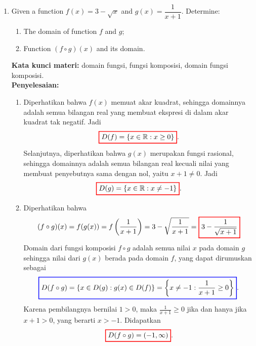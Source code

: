 \documentclass[10pt,openany,a4paper]{article}
\theoremstyle{definition}
\theoremstyle{definition}
\theoremstyle{plain}
\newenvironment{jawab}[2][tes]{%
\par\noindent\textbf{Kata kunci materi:} #1.\\
\textbf{Penyelesaian:} #2%
}{}
\begin{document}
\begin{enumerate}
    \item Given a function $f(x)=3-\sqrt{x}$ and $g(x)=\dfrac{1}{x+1}$. Determine:
    \begin{enumerate}
        \item[a)] The domain of function $f$ and $g$;
        \item[b)] Function $(f\circ g)(x)$ and its domain.
    \end{enumerate}
    \begin{jawab}[domain fungsi, fungsi komposisi, domain fungsi komposisi]{
        \begin{enumerate}
            \item Diperhatikan bahwa $f(x)$ memuat akar kuadrat, sehingga domainnya adalah semua bilangan real yang membuat ekspresi di dalam akar kuadrat tak negatif. Jadi
            \begin{align*}
                \colorlet{oldcolor}{.}
        \color{red}
        \setlength{\fboxrule}{1pt} \boxed{\color{oldcolor}D(f)=\{x \in \mathbb{R} : x \geq 0\}}\color{oldcolor}.
            \end{align*}
            Selanjutnya, diperhatikan bahwa $g(x)$ merupakan fungsi rasional, sehingga domainnya adalah semua bilangan real kecuali nilai yang membuat penyebutnya sama dengan nol, yaitu $x+1\neq 0$. Jadi
            \begin{align*}
                \colorlet{oldcolor}{.}
        \color{red}
        \setlength{\fboxrule}{1pt} \boxed{\color{oldcolor}D(g)=\{x \in \mathbb{R} : x \neq -1\}}\color{oldcolor}.
            \end{align*}
            \item Diperhatikan bahwa
            \begin{align*}
                (f\circ g)(x) = f(g(x)) = f\left(\frac{1}{x+1}\right) = 3 - \sqrt{\frac{1}{x+1}} = \colorlet{oldcolor}{.}
        \color{red}
        \setlength{\fboxrule}{1pt} \boxed{\color{oldcolor}3 - \frac{1}{\sqrt{x+1}}}\color{oldcolor}
            \end{align*}
            Domain dari fungsi komposisi $f\circ g$ adalah semua nilai $x$ pada domain $g$ sehingga nilai dari $g(x)$ berada pada domain $f$, yang dapat dirumuskan sebagai
            \begin{align*}
                \colorlet{oldcolor}{.}
        \color{blue}
        \setlength{\fboxrule}{1pt} \boxed{\color{oldcolor}D(f\circ g) = \{x \in D(g) : g(x) \in D(f)\} = \left\{x \neq -1 : \frac{1}{x+1} \geq 0\right\}}\color{oldcolor}.
            \end{align*}
            Karena pembilangnya bernilai $1>0$, maka $\frac{1}{x+1} \geq 0$ jika dan hanya jika $x+1 > 0$, yang berarti $x > -1$. Didapatkan
            \begin{align*}
                \colorlet{oldcolor}{.}
        \color{red}
        \setlength{\fboxrule}{1pt} \boxed{\color{oldcolor}D(f\circ g) = (-1, \infty)}\color{oldcolor}.
            \end{align*}
        \end{enumerate}
    }
    \end{jawab}


\end{enumerate}
\end{document}
